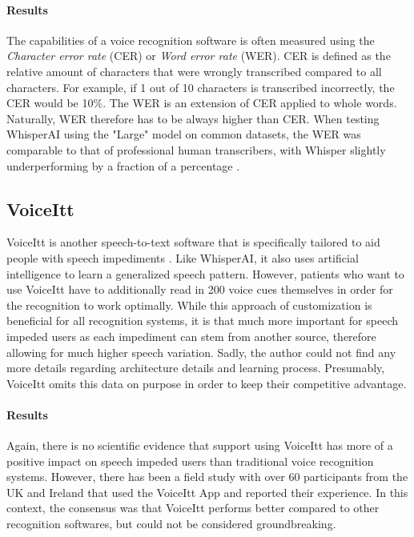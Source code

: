\documentclass[draft,final]{vutinfth} %
\begin{document}
\paragraph{Results} 
The capabilities of a voice recognition software is often measured using the \emph{Character error rate} (CER) or \emph{Word error rate} (WER). CER is defined as the relative amount of characters that were wrongly transcribed compared to all characters. For example, if 1 out of 10 characters is transcribed incorrectly, the CER would be 10\%. The WER is an extension of CER applied to whole words. Naturally, WER therefore has to be always higher than CER.
When testing WhisperAI using the "Large" model on common datasets, the WER was comparable to that of professional human transcribers, with Whisper slightly underperforming by a fraction of a percentage \cite{radford2023robust}.
\subsection{VoiceItt}
VoiceItt is another speech-to-text software that is specifically tailored to aid people with speech impediments \cite{howarth2024developing}. Like WhisperAI, it also uses artificial intelligence to learn a generalized speech pattern. However, patients who want to use VoiceItt have to additionally read in 200 voice cues themselves in order for the recognition to work optimally. While this approach of customization is beneficial for all recognition systems, it is that much more important for speech impeded users as each impediment can stem from another source, therefore allowing for much higher speech variation. Sadly, the author could not find any more details regarding architecture details and learning process. Presumably, VoiceItt omits this data on purpose in order to keep their competitive advantage.

\paragraph{Results}
Again, there is no scientific evidence that support using VoiceItt has more of a positive impact on speech impeded users than traditional voice recognition systems. However, there has been a field study \cite{howarth2024developing} with over 60 participants from the UK and Ireland that used the VoiceItt App and reported their experience. In this context, the consensus was that VoiceItt performs better compared to other recognition softwares, but could not be considered groundbreaking.
\end{document}
